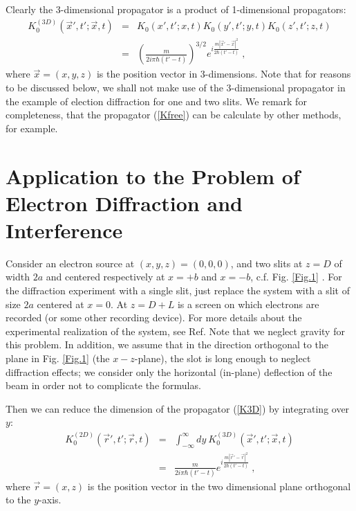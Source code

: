 \documentclass[12pt,aps,prb,preprint]{revtex4-1}   %
\begin{document}
Clearly the 3-dimensional propagator is a product of 1-dimensional propagators:
\begin{eqnarray}\label{K3D}
K_{0}^{(3D)}(\overrightarrow{x}',t';\overrightarrow{x},t)&=&K_0(x',t';x,t)K_0(y',t';y,t)K_0(z',t';z,t)
{}\nonumber\\{}&=&\left(\frac{m}{2i\pi\hbar(t'-t)}\right)^{3/2}
e^{i\frac{m|\overrightarrow{x}'-\overrightarrow{x}|^2}{2\hbar(t'-t)}}\ , 
\end{eqnarray}
where $\overrightarrow{x}=(x,y,z)$ is the position vector in 3-dimensions.
Note that for reasons to be discussed below,
we shall not make use of the 3-dimensional propagator in the example 
of election diffraction for one and two slits. 
We remark for completeness, that the propagator (\ref{Kfree})
can be calculate by other methods, for example.\cite{Kleinert}


\section{Application to the Problem of Electron Diffraction and Interference}

Consider an electron source at $(x,y,z) = (0,0,0)$, and two slits
at $z=D$ of width $2a$ and centered respectively at $x=+b$ and
$x=-b$, c.f. Fig. \ref{Fig.1} . For the diffraction experiment with
a single slit, just replace the system with a slit of size $ 2a $
centered at $x=0$. At $ z = D + L $ is a screen on which electrons
are recorded (or some other recording device). For more details
about the experimental realization of the system, see Ref. \cite{Frabboni} 
Note that we neglect gravity for this
problem. In addition, we assume that in the direction orthogonal
to the plane in Fig. \ref{Fig.1} (the $x-z$-plane), the slot is long
enough to neglect diffraction effects; we consider only the
horizontal (in-plane) deflection of the beam in order not to
complicate the formulas. 

Then we can reduce the dimension of the propagator (\ref{K3D}) by integrating over $y$:
\begin{eqnarray}\label{K2D}
K_{0}^{(2D)}(\overrightarrow{r}',t';\overrightarrow{r},t)&=&
\int_{-\infty}^{\infty}dy\ K_{0}^{(3D)}(\overrightarrow{x}',t';\overrightarrow{x},t)
{}\nonumber\\{}&=&\frac{m}{2i\pi\hbar(t'-t)}
e^{i\frac{m|\overrightarrow{r}'-\overrightarrow{r}|^2}{2\hbar(t'-t)}}\ ,  
\end{eqnarray}
where $\overrightarrow{r}=(x,z)$ is the position vector in the two dimensional plane orthogonal to the $y$-axis.
\end{document}
